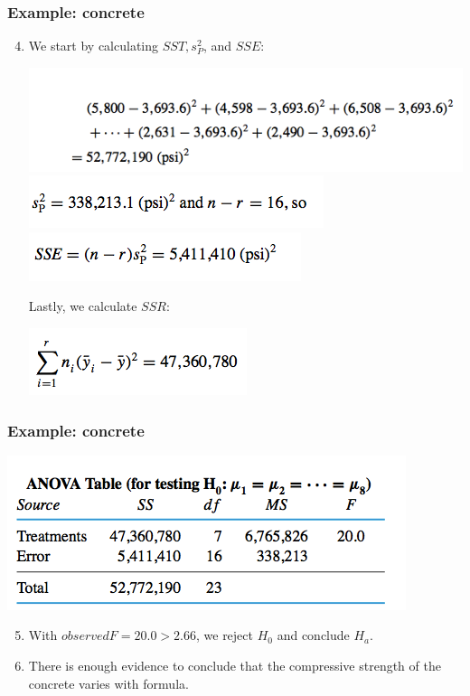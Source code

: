 \documentclass[handout]{beamer}\usepackage[]{graphicx}\usepackage[]{color}
\numberwithin{equation}{section}
\begin{document}
\begin{frame}
\frametitle{Example: concrete}
\begin{enumerate}
\setcounter{enumi}{3}
\item We start by calculating $SST, s^2_P$, and $SSE$:
\begin{center}
 \includegraphics{../../fig/conc1.png}
 \includegraphics{../../fig/conc2.png}
 \includegraphics{../../fig/conc3.png}
\end{center}
Lastly, we calculate $SSR$:
\begin{center}
 \includegraphics{../../fig/conc4.png}
\end{center}
\end{enumerate}
\end{frame}

\begin{frame}
\frametitle{Example: concrete}
\begin{center}
 \includegraphics{../../fig/conc5.png}
\end{center}
\begin{enumerate}
\setcounter{enumi}{4}
\item With $observedF = 20.0 > 2.66$, we reject $H_0$ and conclude $H_a$.
\item There is enough evidence to conclude that the compressive strength of the concrete varies with formula.
\end{enumerate}
\end{frame}
\end{document}
